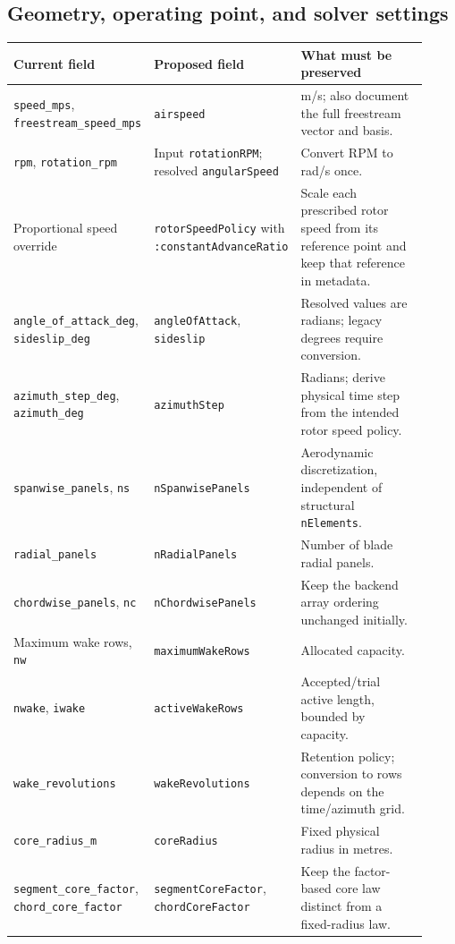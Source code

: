 \documentclass[11pt,a4paper]{article}
\newcommand{\code}{\nolinkurl}
\begin{document}
\subsection{Geometry, operating point, and solver settings}

\begingroup\small
\begin{longtable}{@{}L{0.29\linewidth}L{0.29\linewidth}L{0.34\linewidth}@{}}
\toprule
Current field & Proposed field & What must be preserved\\
\midrule\endhead
\code{speed_mps}, \code{freestream_speed_mps} & \code{airspeed} &
m/s; also document the full freestream vector and basis.\\
\code{rpm}, \code{rotation_rpm} & Input \code{rotationRPM}; resolved
\code{angularSpeed} & Convert RPM to rad/s once.\\
Proportional speed override & \code{rotorSpeedPolicy} with
\code{:constantAdvanceRatio} & Scale each prescribed rotor speed from its
reference point and keep that reference in metadata.\\
\code{angle_of_attack_deg}, \code{sideslip_deg} & \code{angleOfAttack},
\code{sideslip} & Resolved values are radians; legacy degrees require conversion.\\
\code{azimuth_step_deg}, \code{azimuth_deg} & \code{azimuthStep} &
Radians; derive physical time step from the intended rotor speed policy.\\
\code{spanwise_panels}, \code{ns} & \code{nSpanwisePanels} &
Aerodynamic discretization, independent of structural \code{nElements}.\\
\code{radial_panels} & \code{nRadialPanels} & Number of blade radial panels.\\
\code{chordwise_panels}, \code{nc} & \code{nChordwisePanels} &
Keep the backend array ordering unchanged initially.\\
Maximum wake rows, \code{nw} & \code{maximumWakeRows} & Allocated capacity.\\
\code{nwake}, \code{iwake} & \code{activeWakeRows} & Accepted/trial active
length, bounded by capacity.\\
\code{wake_revolutions} & \code{wakeRevolutions} & Retention policy;
conversion to rows depends on the time/azimuth grid.\\
\code{core_radius_m} & \code{coreRadius} & Fixed physical radius in metres.\\
\code{segment_core_factor}, \code{chord_core_factor} &
\code{segmentCoreFactor}, \code{chordCoreFactor} & Keep the factor-based
core law distinct from a fixed-radius law.\\

\end{longtable}
\end{document}
